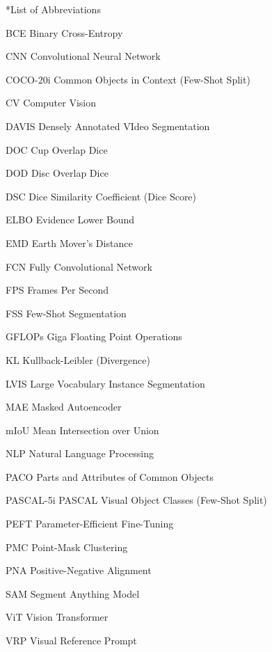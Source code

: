 \documentclass[journal,12pt,onecolumn,draftclsnofoot]{IEEEtran}
\makeatletter
\newcounter{chapter}
\renewcommand{\thechapter}{\arabic{chapter}}
\newcommand{\my@chapter}[1]{%
    \cleardoublepage 
    \par\vspace*{4ex}%
    \refstepcounter{chapter}%
    \setcounter{section}{0}%
    \setcounter{figure}{0}%
    \setcounter{table}{0}%
    \setcounter{equation}{0}%
    \addcontentsline{toc}{chapter}{\protect\numberline{\thechapter}#1}%
    \addtocontents{lof}{\protect\addvspace{10\p@}}%
    \addtocontents{lot}{\protect\addvspace{10\p@}}%
    {\noindent\normalfont\Huge\bfseries Chapter \thechapter \par\vspace{2ex}\noindent\huge #1\par}%
    \@afterheading
    \vspace*{4ex}%
}
\newcommand{\my@schapter}[1]{%
    \cleardoublepage
    \par\vspace*{4ex}%
    {\noindent\normalfont\Huge\bfseries #1\par}%
    \@afterheading
    \vspace*{4ex}%
}
\def\chapter{\@ifstar{\my@schapter}{\my@chapter}}
\makeatother
\begin{document}
\chapter*{List of Abbreviations}
\begin{IEEEdescription}
    \item[BCE] Binary Cross-Entropy
    \item[CNN] Convolutional Neural Network
    \item[COCO-20i] Common Objects in Context (Few-Shot Split)
    \item[CV] Computer Vision
    \item[DAVIS] Densely Annotated VIdeo Segmentation
    \item[DOC] Cup Overlap Dice
    \item[DOD] Disc Overlap Dice
    \item[DSC] Dice Similarity Coefficient (Dice Score)
    \item[ELBO] Evidence Lower Bound
    \item[EMD] Earth Mover's Distance
    \item[FCN] Fully Convolutional Network
    \item[FPS] Frames Per Second
    \item[FSS] Few-Shot Segmentation
    \item[GFLOPs] Giga Floating Point Operations
    \item[KL] Kullback-Leibler (Divergence)
    \item[LVIS] Large Vocabulary Instance Segmentation
    \item[MAE] Masked Autoencoder
    \item[mIoU] Mean Intersection over Union
    \item[NLP] Natural Language Processing
    \item[PACO] Parts and Attributes of Common Objects
    \item[PASCAL-5i] PASCAL Visual Object Classes (Few-Shot Split)
    \item[PEFT] Parameter-Efficient Fine-Tuning
    \item[PMC] Point-Mask Clustering
    \item[PNA] Positive-Negative Alignment
    \item[SAM] Segment Anything Model
    \item[ViT] Vision Transformer
    \item[VRP] Visual Reference Prompt
\end{IEEEdescription}
\newpage
\end{document}
